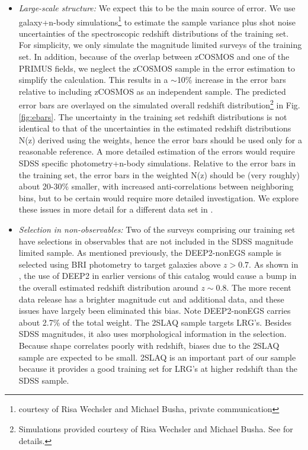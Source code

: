 \documentclass{emulateapj}
\begin{document}
\begin{itemize}

\item {\it Large-scale structure:} We expect this to be the main source of
error.  We use galaxy+n-body simulations\footnote{courtesy of Risa Wechsler and
Michael Busha, private communication} to estimate the sample variance plus shot
noise uncertainties of the spectroscopic redshift distributions of the training
set.  For simplicity, we only simulate the magnitude limited surveys of the
training set.  In addition, because of the overlap between zCOSMOS and one of
the PRIMUS fields, we neglect the zCOSMOS sample in the error estimation to
simplify the calculation.  This results in a $\sim$10\% increase in the error
bars relative to including zCOSMOS as an independent sample.  The predicted
error bars are overlayed on the simulated overall redshift distribution\footnote{Simulations provided courtesy of Risa Wechsler and Michael Busha. See \cite{bushasimulations} for details.} in Fig.
\ref{fig:ebars}.  The uncertainty in the training set redshift distributions is
not identical to that of the uncertainties in the estimated redshift
distributions N(z) derived using the weights, hence the error bars should be
used only for a reasonable reference.  A more detailed estimation of the errors
would require SDSS specific photometry+n-body simulations.  Relative to the
error bars in the training set, the error bars in the weighted N(z) should be (very roughly) about
20-30\% smaller, with increased anti-correlations between neighboring bins, 
but to be certain would require more detailed investigation.  %
We explore these issues in more detail for a different data set in \citet{CunhaPhotozLSS11}.

\item {\it Selection in non-observables:} Two of the surveys comprising our
training set have selections in observables that are not included in the SDSS
magnitude limited sample.  As mentioned previously, the DEEP2-nonEGS sample is
selected using BRI photometry to target galaxies above $z>0.7$.  As shown in
\citet{CunhaPhotoz09}, the use of DEEP2 in earlier versions of this catalog
would cause a bump in the overall estimated redshift distribution around $z\sim
0.8$.  The more recent data release has a brighter magnitude cut and additional
data, and these issues have largely been eliminated this bias.  Note
DEEP2-nonEGS carries about 2.7\% of the total weight.  The 2SLAQ sample targets
LRG's.  Besides SDSS magnitudes, it also uses morphological information in the
selection.  Because shape correlates poorly with redshift, biases due to the
2SLAQ sample are expected to be small.  2SLAQ is an important part of our
sample because it provides a good training set for LRG's at higher redshift
than the SDSS sample.


\end{itemize}
\end{document}
